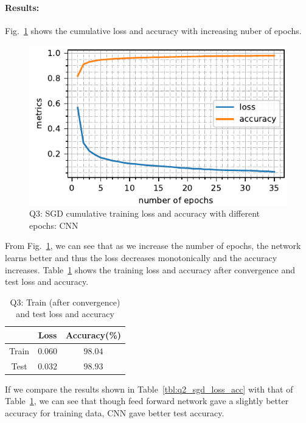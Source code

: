 \paragraph{Results:} Fig.~\ref{fig:q3_sgd_loss_acc} shows the cumulative loss and accuracy with increasing nuber of epochs.
\begin{figure}[!h]
	\centering
	\includegraphics[scale=1.0,trim={0cm 0cm 0cm 0cm},clip]{./code/generatedPlots/q3_sgd_loss_acc.pdf}
	\caption{Q3: SGD cumulative training loss and accuracy with different epochs: CNN}
	\label{fig:q3_sgd_loss_acc}
\end{figure}
From Fig.~\ref{fig:q3_sgd_loss_acc}, we can see that as we increase the number of epochs, the network learns better and thus the loss decreases monotonically and the accuracy increases. Table~\ref{tbl:q3_sgd_loss_acc} shows the training loss and accuracy after convergence and test loss and accuracy.
\begin{table}[ht]
	\centering
	\caption{Q3: Train (after convergence) and test loss and accuracy}
	\begin{tabular}[t]{ccc} 
		\hline
		& Loss & Accuracy(\%)\\ [0.5ex] 
		\hline
		Train 	& $0.060$ 	& $98.04$\\
		Test 	& $0.032$ 	& $98.93$\\[1ex]
		\hline
	\end{tabular}
	\label{tbl:q3_sgd_loss_acc}
\end{table}
If we compare the results shown in Table~\ref{tbl:q2_sgd_loss_acc} with that of Table~\ref{tbl:q3_sgd_loss_acc}, we can see that though feed forward network gave a slightly better accuracy for training data, CNN gave better test accuracy.
